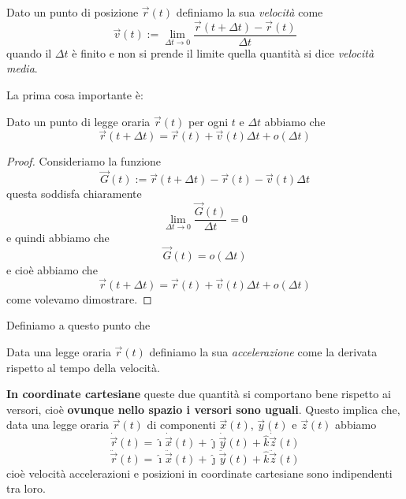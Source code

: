 \documentclass[11pt]{scrartcl}
\newcommand{\ihat}{\hat{\imath}}
\newcommand{\jhat}{\hat{\jmath}}
\newcommand{\khat}{\hat{k}}
\begin{document}
	\begin{definition}[Velocità]
		Dato un punto di posizione $\vec{r}(t)$ definiamo la sua \textit{velocità} come
		$$\vec{v}(t):=\lim_{\Delta t \to 0}\frac{\vec{r}(t+\Delta t)-\vec{r}(t)}{\Delta t}$$
		quando il $\Delta t $ è finito e non si prende il limite quella quantità si dice \textit{velocità media}.
	\end{definition}
	La prima cosa importante è:
	\begin{lemma}
		Dato un punto di legge oraria $\vec{r}(t)$ per ogni $t$ e $\Delta t$ abbiamo che 
		$$\vec{r}(t+\Delta t)=\vec{r}(t)+\vec{v}(t)\Delta t + o(\Delta t)$$
	\end{lemma}
	\begin{proof}
		Consideriamo la funzione
		$$\vec{G}(t):=\vec{r}(t+\Delta t)-\vec{r}(t)-\vec{v}(t)\Delta t$$
		questa soddisfa chiaramente
		$$\lim_{\Delta t\to 0}\frac{\vec{G}(t)}{\Delta t}=0$$
		e quindi abbiamo che 
		$$\vec{G}(t)=o(\Delta t)$$
		e cioè abbiamo che 
		$$\vec{r}(t+\Delta t)=\vec{r}(t)+\vec{v}(t)\Delta t + o(\Delta t)$$
		come volevamo dimostrare.
	\end{proof}
	Definiamo a questo punto che 
	\begin{definition}[Accelerazione]
		Data una legge oraria $\vec{r}(t)$ definiamo la sua \textit{accelerazione} come la derivata rispetto al tempo della velocità.
	\end{definition}
	\textbf{In coordinate cartesiane} queste due quantità si comportano bene rispetto ai versori, cioè \textbf{ovunque nello spazio i versori sono uguali}. Questo implica che, data una legge oraria $\vec{r}(t)$ di componenti $\vec{x}(t)$, $\vec{y}(t)$ e $\vec{z}(t)$ abbiamo
	$$\dot{\vec{r}}(t)=\ihat\dot{\vec{x}}(t)+\jhat\dot{\vec{y}}(t)+\khat\dot{\vec{z}}(t)$$
	$$\ddot{\vec{r}}(t)=\ihat\ddot{\vec{x}}(t)+\jhat\ddot{\vec{y}}(t)+\khat\ddot{\vec{z}}(t)$$
	cioè velocità accelerazioni e posizioni in coordinate cartesiane sono indipendenti tra loro. 
\end{document}
